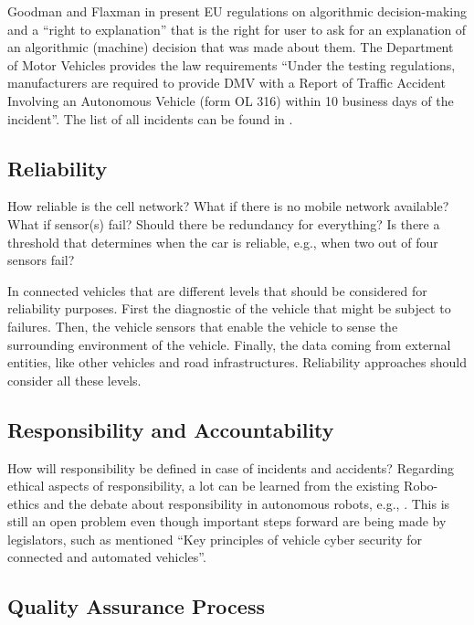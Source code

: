 Goodman and Flaxman in \cite{2016arXiv160608813G_GoodmanFlaxman} present EU regulations on algorithmic decision-making and a \enquote{right to explanation} that is the right for user to ask for an explanation of an algorithmic (machine) decision that was made about them.
The Department of Motor Vehicles provides the law requirements \cite{DepartmentofMotorVehiclesStateofCalifornia} \enquote{Under the testing regulations, manufacturers are required to provide DMV with a Report of Traffic Accident Involving an Autonomous Vehicle (form OL 316) within 10 business days of the incident}. The list of all incidents can be found in \cite{DepartmentofMotorVehiclesStateofCalifornia_OL316Reports}.


\subsection{Reliability}
\label{sec:EAofTC:Reliability}

How reliable is the cell network? What if there is no mobile network available? What if sensor(s) fail? Should there be redundancy for everything? Is there a threshold that determines when the car is reliable, e.g., when two out of four sensors fail?  

In connected vehicles that are different levels that should be considered for reliability purposes. First the diagnostic of the vehicle that might be subject to failures. Then, the vehicle sensors that enable the vehicle to sense the surrounding environment of the vehicle. Finally, the data coming from external entities, like other vehicles and road infrastructures. Reliability approaches should consider all these levels.


\subsection{Responsibility and Accountability}
\label{sec:EAofTC:ResponsibilityAndAccountability}

How will responsibility be defined in case of incidents and accidents? Regarding ethical aspects of responsibility, a lot can be learned from the existing Robo-ethics and the debate about responsibility in autonomous robots, e.g., \cite{Dodig-Crnkovic:2008:SMR:1566864.1566888}. This is still an open problem even though important steps forward are being made by legislators, such as mentioned \enquote{Key principles of vehicle cyber security for connected and automated vehicles}.


\subsection{Quality Assurance Process}
\label{sec:EAofTC:QualityAssuranceProcess}

